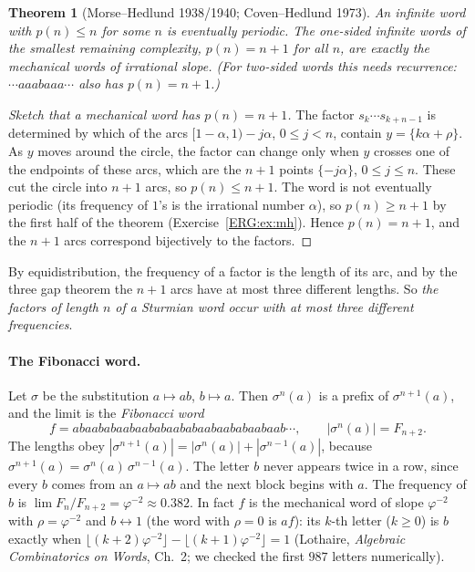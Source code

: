 \documentclass[11pt,openany]{book}
\theoremstyle{plain}
\newtheorem{theorem}{Theorem}[chapter]
\theoremstyle{definition}
\theoremstyle{remark}
\newcommand{\abs}[1]{\left\lvert #1 \right\rvert}
\begin{document}
\begin{theorem}[Morse--Hedlund 1938/1940; Coven--Hedlund 1973]\label{ERG:thm:morsehedlund}
An infinite word with $p(n)\le n$ for some $n$ is eventually periodic. The one-sided infinite words of
the smallest remaining complexity, $p(n)=n+1$ for all $n$, are exactly the mechanical words of
irrational slope. (For two-sided words this needs recurrence: $\cdots aaabaaa\cdots$ also has
$p(n)=n+1$.)
\end{theorem}

\begin{proof}[Sketch that a mechanical word has $p(n)=n+1$]
The factor $s_k\cdots s_{k+n-1}$ is determined by which of the arcs $[1-\alpha,1)-j\alpha$,
$0\le j<n$, contain $y=\{k\alpha+\rho\}$. As $y$ moves around the circle, the factor can change only when
$y$ crosses one of the endpoints of these arcs, which are the $n+1$ points $\{-j\alpha\}$, $0\le j\le n$.
These cut the circle into $n+1$ arcs, so $p(n)\le n+1$. The word is not eventually periodic (its frequency
of $1$'s is the irrational number $\alpha$), so $p(n)\ge n+1$ by the first half of the theorem
(Exercise~\ref{ERG:ex:mh}). Hence $p(n)=n+1$, and the $n+1$ arcs correspond bijectively to the factors.
\end{proof}

By equidistribution, the frequency of a factor is the length of its arc, and by the three gap theorem
the $n+1$ arcs have at most three different lengths. So \emph{the factors of length $n$ of a Sturmian
word occur with at most three different frequencies}.

\paragraph{The Fibonacci word.} Let $\sigma$ be the substitution $a\mapsto ab$, $b\mapsto a$. Then
$\sigma^n(a)$ is a prefix of $\sigma^{n+1}(a)$, and the limit is the \emph{Fibonacci word}
\[
  f=abaababaabaababaababaabaababaabaab\cdots,\qquad \abs{\sigma^n(a)}=F_{n+2}.
\]
The lengths obey $\abs{\sigma^{n+1}(a)}=\abs{\sigma^n(a)}+\abs{\sigma^{n-1}(a)}$, because
$\sigma^{n+1}(a)=\sigma^n(a)\,\sigma^{n-1}(a)$. The letter $b$ never appears twice in a row, since
every $b$ comes from an $a\mapsto ab$ and the next block begins with $a$. The frequency of $b$ is
$\lim F_n/F_{n+2}=\varphi^{-2}\approx0.382$. In fact $f$ is the mechanical word of slope
$\varphi^{-2}$ with $\rho=\varphi^{-2}$ and $b\leftrightarrow1$ (the word with $\rho=0$ is $af$): its $k$-th letter ($k\ge0$) is $b$ exactly when
$\lfloor(k+2)\varphi^{-2}\rfloor-\lfloor(k+1)\varphi^{-2}\rfloor=1$ (Lothaire,
\emph{Algebraic Combinatorics on Words}, Ch.~2; we checked the first $987$ letters numerically).
\end{document}
